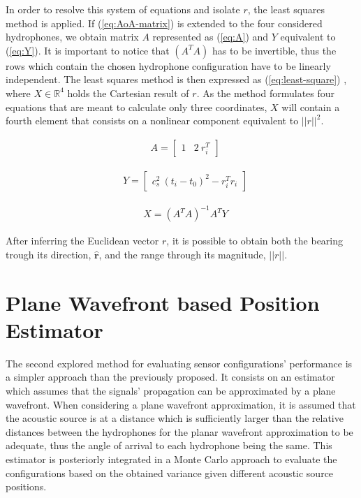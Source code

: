 In order to resolve this system of equations and isolate $r$, the least squares method is applied. If (\ref{eq:AoA-matrix}) is extended to the four considered hydrophones, we obtain matrix $A$ represented as (\ref{eq:A}) and $Y$ equivalent to (\ref{eq:Y}). It is important to notice that $(A^TA)$ has to be invertible, thus the rows which contain the chosen hydrophone configuration have to be linearly independent. The least squares method is then expressed as (\ref{eq:least-square}) \cite{leassquare-lbl}, where $X \in \mathbb{R}^{4}$ holds the Cartesian result of $r$. As the method formulates four equations that are meant to calculate only three coordinates, $X$ will contain a fourth element that consists on a nonlinear component equivalent to $||r||^{2}$.

\begin{eqnarray}
	& A = 
	\begin{bmatrix}
		1 & 2\: r_i^{T}
	\end{bmatrix}
	\label{eq:A}
\end{eqnarray}

\begin{eqnarray}
	& Y = 
	\begin{bmatrix}
		c_s^{2}\: (t_i-t_0)^2 - r_i^{T} r_i
	\end{bmatrix}
	\label{eq:Y}
\end{eqnarray}

\begin{eqnarray}
	& X = (A^{T}A)^{-1}A^{T}Y
	\label{eq:least-square}
\end{eqnarray}

After inferring the Euclidean vector $r$, it is possible to obtain both the bearing trough its direction, $\hat{\boldsymbol{r}}$, and the range through its magnitude, $||r||$.

\section{Plane Wavefront based Position Estimator}

The second explored method for evaluating sensor configurations' performance is a simpler approach than the previously proposed. It consists on an estimator which assumes that the signals' propagation can be approximated by a plane wavefront. When considering a plane wavefront approximation, it is assumed that the acoustic source is at a distance which is sufficiently larger than the relative distances between the hydrophones for the planar wavefront approximation to be adequate, thus the angle of arrival to each hydrophone being the same. This estimator is posteriorly integrated in a Monte Carlo approach to evaluate the configurations based on the obtained variance given different acoustic source positions.

